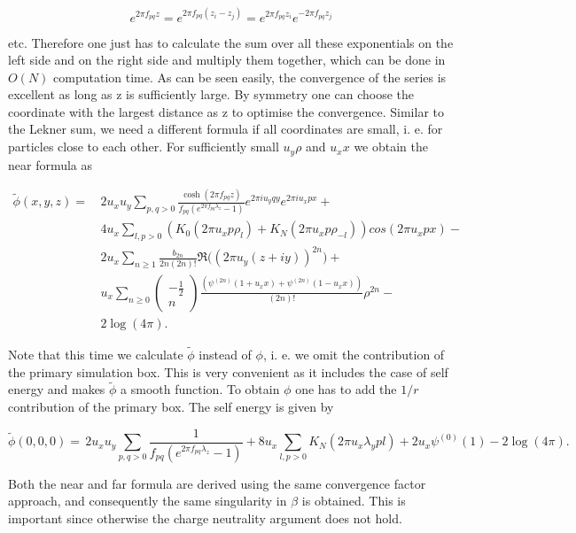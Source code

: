 \[ e^{2\pi f_{pq}z}=e^{2\pi f_{pq}(z_i-z_j)}=e^{2\pi
  f_{pq}z_i}e^{-2\pi f_{pq}z_j} \]

etc. Therefore one just has to calculate the sum over all these
exponentials on the left side and on the right side and multiply them
together, which can be done in $O(N)$ computation time. As can be seen
easily, the convergence of the series is excellent as long as z is
sufficiently large. By symmetry one can choose the coordinate with the
largest distance as z to optimise the convergence. Similar to the
Lekner sum, we need a different formula if all coordinates are small,
i. e. for particles close to each other. For sufficiently small
$u_y\rho$ and $u_xx$ we obtain the near formula as

\[ \begin{array}{rl} \tilde\phi(x,y,z)=\, & 2 u_x
  u_y\sum\limits_{p,q>0} \frac{\cosh(2\pi f_{pq}z)}{f_{pq}
    \left(e^{2\pi f_{pq}\lambda_z} - 1\right)} e^{2\pi i u_y q
    y}e^{2\pi i u_x p x} +\\ & 4u_x\sum\limits_{l,p>0}\left(K_0(2\pi
    u_x p\rho_l) + K_N(2\pi u_x p\rho_{-l})\right)cos(2\pi u_x p x)
  -\\ & 2u_x\sum\limits_{n\ge 1}\frac{b_{2n}}{2n(2n)!}\Re\bigl((2\pi
  u_y (z+iy))^{2n}\bigr) +\\ & u_x\sum\limits_{n\ge
    0}\left(\begin{array}{c}-\frac{1}{2}\\
      n\end{array}\right)\frac{\left( \psi^{(2n)}(1 + u_x x) +
      \psi^{(2n)}(1 - u_x x)\right)}{(2n)!}\rho^{2n} -\\ &
  2\log(4\pi). \end{array} \]

Note that this time we calculate $\tilde{\phi}$ instead of $\phi$, i.
e. we omit the contribution of the primary simulation box. This is
very convenient as it includes the case of self energy and makes
$\tilde{\phi}$ a smooth function. To obtain $\phi$ one has to add the
$1/r$ contribution of the primary box. The self energy is given by

\[ \tilde\phi(0,0,0)=\, 2 u_x u_y\sum\limits_{p,q>0} \frac{1}{f_{pq}
  \left(e^{2\pi f_{pq}\lambda_z} - 1\right)}+
8u_x\sum\limits_{l,p>0}K_N(2\pi u_x\lambda_y p l) + 2 u_x\psi^{(0)}(1)
- 2\log(4\pi). \]

Both the near and far formula are derived using the same convergence
factor approach, and consequently the same singularity in $\beta$ is
obtained. This is important since otherwise the charge neutrality
argument does not hold.

